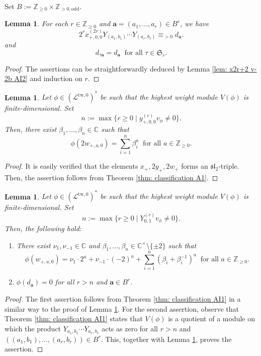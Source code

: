 \documentclass[12pt,a4paper]{amsart}
\newtheorem{lem}[thm]{Lemma}
\theoremstyle{definition}
\numberwithin{equation}{subsection}
\begin{document}
Set $B := \mathbb{Z}_{\geq 0} \times \mathbb{Z}_{> 0,\mathrm{odd}}$.

\begin{lem}\label{lem: x2r+2 v-2b equiv dbfa AI2}
  For each $r \in \mathbb{Z}_{\geq 0}$ and $\mathbf{a} = (a_1,\dots,a_r) \in B^r$, we have
  \[
    2^r x_{+,0,0}^{(2r)} Y_{(a_1,b_1)} \cdots Y_{(a_r,b_r)} \equiv_{>0} d_\mathbf{a}.
  \]
  and
  \[
    d_{\tau \mathbf{a}} = d_\mathbf{a} \ \text{ for all } \tau \in \mathfrak{S}_r.
  \]
\end{lem}
\begin{proof}
  The assertions can be straightforwardly deduced by Lemma \ref{lem: x2r+2 v-2b AI2} and induction on $r$.
\end{proof}

\begin{lem}\label{lem: deduction from A1}
  Let $\phi \in (\mathcal{L}^{\mathrm{tw},0})^*$ be such that the highest weight module $V(\phi)$ is finite-dimensional.
  Set
  \[
    n := \max\{ r \geq 0 \mid y_{+,0,0}^{(r)} v_\phi \neq 0 \}.
  \]
  Then, there exist $\beta_1,\dots,\beta_n \in \mathbb{C}$ such that
  \[
    \phi(2w_{+,a,0}) = \sum_{i=1}^n \beta_i^a \ \text{ for all } a \in \mathbb{Z}_{\geq 0}.
  \]
\end{lem}
\begin{proof}
  It is easily verified that the elements $x_+,2y_+,2w_+$ forms an $\mathfrak{sl}_2$-triple.
  Then, the assertion follows from Theorem \ref{thm: classification A1}.
\end{proof}

\begin{lem}\label{lem: deduction from AI1}
  Let $\phi \in (\mathcal{L}^{\mathrm{tw},0})^*$ be such that the highest weight module $V(\phi)$ is finite-dimensional.
  Set
  \[
    n := \max\{ r \geq 0 \mid Y_{0,1}^{(r)} v_\phi \neq 0 \}.
  \]
  Then, the following hold$:$
  \begin{enumerate}
    \item There exist $\nu_1,\nu_{-1} \in \mathbb{C}$ and $\beta_1,\dots,\beta_n \in \mathbb{C}^\times \setminus \{ \pm 2 \}$ such that
    \[
      \phi(w_{+,a,0}) = \nu_1 \cdot 2^a + \nu_{-1} \cdot (-2)^a + \sum_{i=1}^n (\beta_i+\beta_i^{-1})^a \ \text{ for all } a \in \mathbb{Z}_{\geq 0}.
    \]
    \item $\phi(d_\mathbf{a}) = 0$ for all $r > n$ and $\mathbf{a} \in B^r$.
  \end{enumerate}
\end{lem}
\begin{proof}
  The first assertion follows from Theorem \ref{thm: classification AI1} in a similar way to the proof of Lemma \ref{lem: deduction from A1}.
  For the second assertion, observe that Theorem \ref{thm: classification AI1} states that $V(\phi)$ is a quotient of a module on which the product $Y_{a_1,b_1} \cdots Y_{a_r,b_r}$ acts as zero for all $r > n$ and $((a_1,b_1),\dots,(a_r,b_r)) \in B^r$.
  This, together with Lemma \ref{lem: x2r+2 v-2b equiv dbfa AI2}, proves the assertion.
\end{proof}
\end{document}
